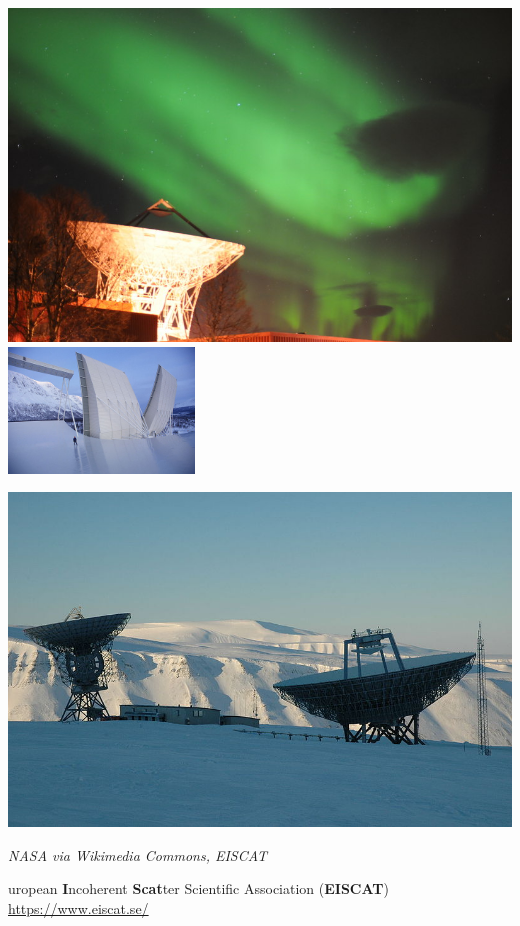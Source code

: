 \begin{frame}[t,fragile]
\frametitle{\hfill}
\vspace{\mytopbit}
\newlength{\picsize}
\setlength{\picsize}{1.3in}

\begin{center}
{
\includegraphics[height=\picsize]{uhf-tro-aurora.jpg}
\includegraphics[height=\picsize,width=1.95in]{eiscat-vhf.jpg}

\includegraphics[height=\picsize]{EISCAT_Svalbard_Radar.jpg}
                \begin{minipage}{0.46\textwidth}{\colblack \scriptsize \it NASA via Wikimedia Commons, EISCAT}\end{minipage}
}
\end{center}
\vfill
    {uropean {\bf I}ncoherent {\bf Scat}ter Scientific Association ({\bf EISCAT})}
    {\small \url{https://www.eiscat.se/}}
\end{frame}

